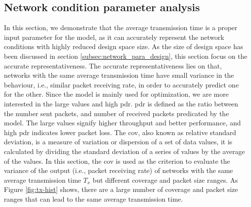 
\subsection{Network condition parameter analysis \label{subsubsec:txselection}}

In this section, we demonstrate that the average transmission time 
is a proper input parameter for the model, as it can accurately represent the network conditions with highly reduced design space size. As the size of design space has been discussed in section \ref{subsec:network_para_design}, this section focus on the accurate representativeness. The accurate representativeness lies on that, networks with the same average transmission time have small variance in the behaviour, i.e., similar packet receiving rate, in order to accurately predict one for the other. Since the model is mainly used for optimization, we are more interested in the large values and high \gls{pdr}.
\gls{pdr} is defined as the ratio between the number sent packets, and number of received packets predicated by the model. The large values signify higher throughput and better performance, and high \gls{pdr} indicates lower packet loss. The \gls{cov}, also known as relative standard deviation, is a measure of variation or dispersion of a set of data values, it is calculated by dividing the standard deviation of a series of values by the average of the values. In this section, the \gls{cov} is used as the criterion to evaluate the variance of the output (i.e., packet receiving rate)  of networks with the same average transmission time $T_x$ but different coverage and packet size ranges. As Figure \ref{fig:tx-hist} shows, there are a large number of coverage and packet size ranges that can lead to the same average transmission time. 







